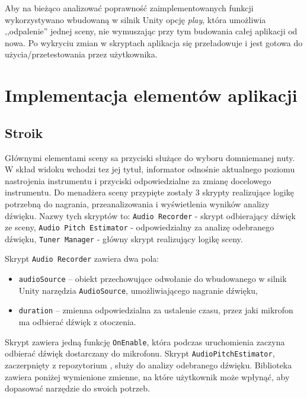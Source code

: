 Aby na bieżąco analizować poprawność zaimplementowanych funkcji wykorzystywano wbudowaną w silnik Unity opcję \emph{play}, która umożliwia ,,odpalenie'' jednej sceny, nie wymuszając przy tym budowania całej aplikacji od nowa. Po wykryciu zmian w skryptach aplikacja się przeładowuje i jest gotowa do użycia/przetestowania przez użytkownika.

\section{Implementacja elementów aplikacji}

\subsection{Stroik}

Głównymi elementami sceny sa przyciski służące do wyboru domniemanej nuty. W skład widoku wchodzi tez jej tytuł, informator odnośnie aktualnego poziomu nastrojenia instrumentu i przyciski odpowiedzialne za zmianę docelowego instrumentu. Do menadżera sceny przypięte zostały 3 skrypty realizujące logikę potrzebną do nagrania, przeanalizowania i wyświetlenia wyników analizy dźwięku. Nazwy tych skryptów to: \texttt{Audio Recorder} - skrypt odbierający dźwięk ze sceny, \texttt{Audio Pitch Estimator} - odpowiedzialny za analizę odebranego dźwięku, \texttt{Tuner Manager} - główny skrypt realizujący logikę sceny. 

Skrypt \texttt{Audio Recorder} zawiera dwa pola:
\begin{itemize}
    \item \texttt{audioSource} -- obiekt przechowujące odwołanie do wbudowanego w silnik Unity narzędzia \texttt{AudioSource}, umożliwiającego nagranie dźwięku,
    \item \texttt{duration} -- zmienna odpowiedzialna za ustalenie czasu, przez jaki mikrofon ma odbierać dźwięk z otoczenia.
\end{itemize}

Skrypt zawiera jedną funkcję \texttt{OnEnable}, która podczas uruchomienia zaczyna odbierać dźwięk dostarczany do mikrofonu. Skrypt \texttt{AudioPitchEstimator}, zaczerpnięty z repozytorium \cite{https://github.com/nakakq/AudioPitchEstimatorForUnity}, %
służy do analizy odebranego dźwięku. Biblioteka zawiera poniżej wymienione zmienne, na które użytkownik może wpłynąć, aby dopasować narzędzie do swoich potrzeb.



